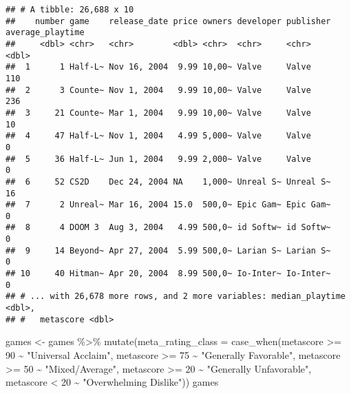 \documentclass[
]{article}
\newenvironment{Shaded}{\begin{snugshade}}{\end{snugshade}}
\newcommand{\AttributeTok}[1]{\textcolor[rgb]{0.77,0.63,0.00}{#1}}
\newcommand{\DecValTok}[1]{\textcolor[rgb]{0.00,0.00,0.81}{#1}}
\newcommand{\FunctionTok}[1]{\textcolor[rgb]{0.00,0.00,0.00}{#1}}
\newcommand{\NormalTok}[1]{#1}
\newcommand{\OtherTok}[1]{\textcolor[rgb]{0.56,0.35,0.01}{#1}}
\newcommand{\SpecialCharTok}[1]{\textcolor[rgb]{0.00,0.00,0.00}{#1}}
\newcommand{\StringTok}[1]{\textcolor[rgb]{0.31,0.60,0.02}{#1}}
\begin{document}
\begin{verbatim}
## # A tibble: 26,688 x 10
##    number game    release_date price owners developer publisher average_playtime
##     <dbl> <chr>   <chr>        <dbl> <chr>  <chr>     <chr>                <dbl>
##  1      1 Half-L~ Nov 16, 2004  9.99 10,00~ Valve     Valve                  110
##  2      3 Counte~ Nov 1, 2004   9.99 10,00~ Valve     Valve                  236
##  3     21 Counte~ Mar 1, 2004   9.99 10,00~ Valve     Valve                   10
##  4     47 Half-L~ Nov 1, 2004   4.99 5,000~ Valve     Valve                    0
##  5     36 Half-L~ Jun 1, 2004   9.99 2,000~ Valve     Valve                    0
##  6     52 CS2D    Dec 24, 2004 NA    1,000~ Unreal S~ Unreal S~               16
##  7      2 Unreal~ Mar 16, 2004 15.0  500,0~ Epic Gam~ Epic Gam~                0
##  8      4 DOOM 3  Aug 3, 2004   4.99 500,0~ id Softw~ id Softw~                0
##  9     14 Beyond~ Apr 27, 2004  5.99 500,0~ Larian S~ Larian S~                0
## 10     40 Hitman~ Apr 20, 2004  8.99 500,0~ Io-Inter~ Io-Inter~                0
## # ... with 26,678 more rows, and 2 more variables: median_playtime <dbl>,
## #   metascore <dbl>
\end{verbatim}

\begin{Shaded}
\begin{Highlighting}[]
\NormalTok{games }\OtherTok{\textless{}{-}}\NormalTok{ games }\SpecialCharTok{\%\textgreater{}\%}
  \FunctionTok{mutate}\NormalTok{(}\AttributeTok{meta\_rating\_class =} \FunctionTok{case\_when}\NormalTok{(metascore }\SpecialCharTok{\textgreater{}=} \DecValTok{90} \SpecialCharTok{\textasciitilde{}} \StringTok{"Universal Acclaim"}\NormalTok{,}
\NormalTok{                                       metascore }\SpecialCharTok{\textgreater{}=} \DecValTok{75} \SpecialCharTok{\textasciitilde{}} \StringTok{"Generally Favorable"}\NormalTok{,}
\NormalTok{                                       metascore }\SpecialCharTok{\textgreater{}=} \DecValTok{50} \SpecialCharTok{\textasciitilde{}} \StringTok{"Mixed/Average"}\NormalTok{,}
\NormalTok{                                       metascore }\SpecialCharTok{\textgreater{}=} \DecValTok{20} \SpecialCharTok{\textasciitilde{}} \StringTok{"Generally Unfavorable"}\NormalTok{,}
\NormalTok{                                       metascore }\SpecialCharTok{\textless{}} \DecValTok{20} \SpecialCharTok{\textasciitilde{}} \StringTok{"Overwhelming Dislike"}\NormalTok{))}
\NormalTok{games}
\end{Highlighting}
\end{Shaded}
\end{document}
